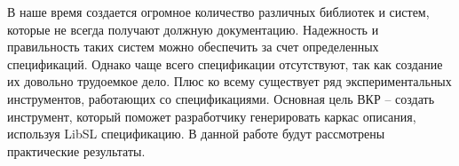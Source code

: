 \intro

В наше время создается огромное количество различных библиотек и систем, которые не всегда получают должную документацию. Надежность и правильность таких систем можно обеспечить за счет определенных спецификаций. 
Однако чаще всего спецификации отсутствуют, так как создание их довольно трудоемкое дело. Плюс ко всему существует ряд экспериментальных инструментов, работающих со спецификациями.
Основная цель ВКР – создать инструмент, который поможет разработчику генерировать каркас описания, используя LibSL спецификацию.
В данной работе будут рассмотрены практические результаты.
